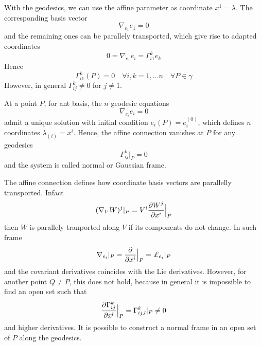     With the geodesics, we can use the affine parameter as coordinate $x^1 = \lambda$. The corresponding basis vector
    \begin{equation*}
        \nabla_{e_1} e_1 = 0
    \end{equation*}
    and the remaining ones can be parallely transported, which give rise to adapted coordinates 
    \begin{equation*}
        0 = \nabla_{e_1} e_i = \Gamma^k_{i1} e_k
    \end{equation*}
    Hence 
    \begin{equation*}
        \Gamma^k_{i1}(P) = 0 \quad \forall i,k = 1, \ldots n \quad \forall P \in \gamma
    \end{equation*}
    However, in general $\Gamma^k_{ij} \neq 0$ for $j \neq 1$.

    At a point $P$, for ant basis, the $n$ geodesic equations 
    \begin{equation*}
        \nabla_{e_i} e_i = 0
    \end{equation*}
    admit a unique solution with initial condition $e_i(P) = e_i^{(0)}$, which defines $n$ coordinates $\lambda_{(i)} = x^i$. Hence, the affine connection vanishes at $P$ for any geodesics 
    \begin{equation*}
        \Gamma^k_{ij} \vert_P = 0
    \end{equation*}
    and the system is called normal or Gaussian frame.

    The affine connection defines how coordinate basis vectors are parallelly transported. Infact
    \begin{equation*}
        (\nabla_V W)^j \vert_P = V^i \frac{\partial W^j}{\partial x^i} \Big \vert_P
    \end{equation*}
    then $W$ is parallely tranported along $V$ if its components do not change. In such frame 
    \begin{equation*}
        \nabla_{e_i} \vert_P = \pdv{}{x^i} \Big \vert_P = \pounds_{e_i} \vert_P
    \end{equation*}
    and the covariant derivatives coincides with the Lie derivatives. However, for another point $Q \neq P$, this does not hold, because in general it is impossible to find an open set such that 
    \begin{equation*}
        \frac{\partial\Gamma^k_{ij}}{\partial x^l} \Big \vert_P = \Gamma^k_{ij,l} \vert_P \neq 0 
    \end{equation*}
    and higher derivatives. It is possible to construct a normal frame in an open set of $P$ along the geodesics.

